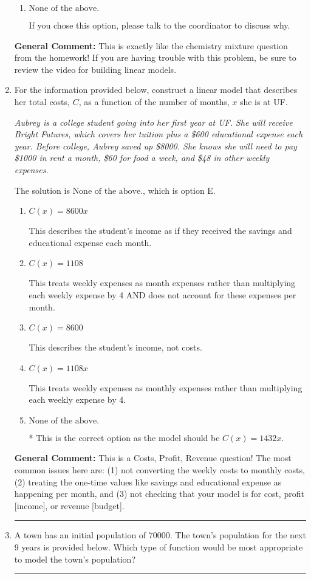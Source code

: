 \documentclass{extbook}[14pt]
\newcommand{\litem}[1]{\item #1

\rule{\textwidth}{0.4pt}}
\begin{document}
\begin{enumerate}
{\begin{enumerate}[label=\Alph*.]
* This is the correct option since the questions asked you to construct the cost model in terms of the weight of the low-quality bean.
\item \( \text{None of the above.} \)

If you chose this option, please talk to the coordinator to discuss why.
\end{enumerate}

\textbf{General Comment:} This is exactly like the chemistry mixture question from the homework! If you are having trouble with this problem, be sure to review the video for building linear models.
}
\litem{
For the information provided below, construct a linear model that describes her total costs, $C$, as a function of the number of months, $x$ she is at UF. 

\begin{center}
    \textit{ Aubrey is a college student going into her first year at UF. She will receive Bright Futures, which covers her tuition plus a \$600 educational expense each year. Before college, Aubrey saved up \$8000. She knows she will need to pay \$1000 in rent a month, \$60 for food a week, and \$48 in other weekly expenses. }
\end{center}
The solution is \( \text{None of the above.} \), which is option E.\begin{enumerate}[label=\Alph*.]
\item \( C(x) = 8600 x \)

This describes the student's income as if they received the savings and educational expense each month.
\item \( C(x) = 1108 \)

This treats weekly expenses as month expenses rather than multiplying each weekly expense by 4 AND does not account for these expenses per month.
\item \( C(x) = 8600 \)

This describes the student's income, not costs.
\item \( C(x) = 1108 x \)

This treats weekly expenses as monthly expenses rather than multiplying each weekly expense by 4.
\item \( \text{None of the above.} \)

* This is the correct option as the model should be $C(x) = 1432 x$.
\end{enumerate}

\textbf{General Comment:} This is a Costs, Profit, Revenue question! The most common issues here are: (1) not converting the weekly costs to monthly costs, (2) treating the one-time values like savings and educational expense as happening per month, and (3) not checking that your model is for cost, profit [income], or revenue [budget].
}
\litem{
A town has an initial population of 70000. The town's population for the next 9 years is provided below. Which type of function would be most appropriate to model the town's population?


}
\end{enumerate}
\end{document}
